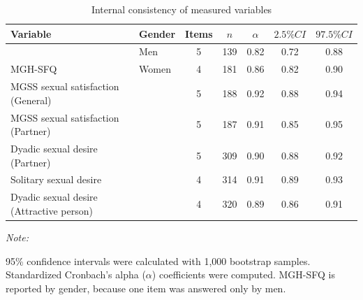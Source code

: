 \documentclass[
  bookmarksnumbered]{article}
\newenvironment{Shaded}{\begin{snugshade}}{\end{snugshade}}
\newcommand{\AttributeTok}[1]{\textcolor[rgb]{0.80,0.80,0.80}{#1}}
\newcommand{\ConstantTok}[1]{\textcolor[rgb]{0.86,0.64,0.64}{\textbf{#1}}}
\newcommand{\FunctionTok}[1]{\textcolor[rgb]{0.94,0.94,0.56}{#1}}
\newcommand{\NormalTok}[1]{\textcolor[rgb]{0.80,0.80,0.80}{#1}}
\newcommand{\SpecialCharTok}[1]{\textcolor[rgb]{0.86,0.64,0.64}{#1}}
\newcommand{\StringTok}[1]{\textcolor[rgb]{0.80,0.58,0.58}{#1}}
\begin{document}
\begin{Shaded}
\end{Shaded}

\begin{table}[H]

\caption{\label{tab:Cronbach-tab}Internal consistency of measured variables}
\centering
\begin{threeparttable}
\begin{tabular}[t]{llccccc}
\toprule
Variable & Gender & Items & $n$ & $\alpha$ & $2.5\% CI$ & $97.5\% CI$\\
\midrule
 & Men & 5 & 139 & 0.82 & 0.72 & 0.88\\
\cmidrule{2-7}
\multirow{-2}{*}{\raggedright\arraybackslash MGH-SFQ} & Women & 4 & 181 & 0.86 & 0.82 & 0.90\\
\cmidrule{1-7}
MGSS sexual satisfaction (General) &  & 5 & 188 & 0.92 & 0.88 & 0.94\\
\cmidrule{1-7}
MGSS sexual satisfaction (Partner) &  & 5 & 187 & 0.91 & 0.85 & 0.95\\
\cmidrule{1-7}
Dyadic sexual desire (Partner) &  & 5 & 309 & 0.90 & 0.88 & 0.92\\
\cmidrule{1-7}
Solitary sexual desire &  & 4 & 314 & 0.91 & 0.89 & 0.93\\
\cmidrule{1-7}
Dyadic sexual desire (Attractive person) &  & 4 & 320 & 0.89 & 0.86 & 0.91\\
\bottomrule
\end{tabular}
\begin{tablenotes}[para]
\item \textit{Note: } 
\item 95\% confidence intervals were calculated with 1,000 bootstrap samples.
           Standardized Cronbach's alpha ($\alpha$) coefficients were computed. 
           MGH-SFQ is reported by gender, because one item was answered only by men.
\end{tablenotes}
\end{threeparttable}
\end{table}
\end{document}
